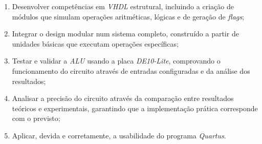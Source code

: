 \begin{enumerate}[$\bullet$]
    \item Desenvolver competências em \textit{VHDL} estrutural, incluindo a criação de módulos que simulam operações aritméticas, lógicas e de geração de \textit{flags};
    \item Integrar o design modular num sistema completo, construído a partir de unidades básicas que executam operações específicas;
    \item Testar e validar a \textit{ALU} usando a placa \textit{DE10-Lite}, comprovando o funcionamento do circuito através de entradas configuradas e da análise dos resultados;
    \item Analisar a precisão do circuito através da comparação entre resultados teóricos e experimentais, garantindo que a implementação prática corresponde com o previsto;
    \item Aplicar, devida e corretamente, a usabilidade do programa \textit{Quartus}.
\end{enumerate}
\newpage